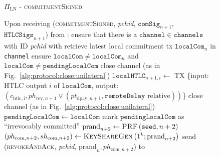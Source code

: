   \begin{figure}[H]
    \begin{protocolbox}{$\Pi_{\mathrm{LN}}$ - \textsc{commitmentSigned}}
      \begin{algorithmic}[1]
        \State Upon receiving (\textsc{commitmentSigned}, \textit{pchid},
        $\mathtt{comSig}_{n+1}$, $\mathtt{HTLCSigs}_{n+1}$) from \bob:
        \Indent
          \State ensure that there is a $\mathtt{channel} \in \mathtt{channels}$
          with ID \textit{pchid} with \bob
          \State retrieve latest local commitment tx $\mathtt{localCom}_n$ in
          \texttt{channel}
          \State ensure $\mathtt{localCom} \neq \mathtt{localCom}_n$ and
          $\mathtt{localCom} \neq \mathtt{pendingLocalCom}$
            \State close channel (as in Fig.~\ref{alg:protocol:close:unilateral})
            \State \Return
          \EndIf
            \State $\mathtt{localHTLC}_{n+1, i} \gets$ TX \{input: HTLC output
            $i$ of $\mathtt{localCom}$, output: $\left(c_{\mathrm{htlc, i}},
            ph_{\mathrm{rev}, n+1} \vee \left(pt_{\mathrm{dpay}, n+1},
            \mathtt{remoteDelay} \text{ relative}\right)\right)$\}
              \State close channel (as in
              Fig.~\ref{alg:protocol:close:unilateral})
              \State \Return
            \EndIf
          \EndFor
          \State $\mathtt{pendingLocalCom} \gets \mathtt{localCom}$
          \State mark $\mathtt{pendingLocalCom}$ as ``irrevocably committed''
          \State $\mathrm{prand}_{n+2} \gets \textsc{PRF}\left(\mathtt{seed},
          n+2\right)$
          \label{alg:protocol:pay:commitmentSigned:prf}
          \State $\left(ph_{\mathrm{com}, n+2}, sh_{\mathrm{com}, n+2}\right)
          \gets \textsc{KeyShareGen}\left(1^k; \mathrm{prand}_{n+2}\right)$
          \State send (\textsc{revokeAndAck}, \textit{pchid}, $\mathrm{prand}_n,
          ph_{\mathrm{com}, n+2}$) to \bob
        \EndIndent
      \end{algorithmic}
    \end{protocolbox}
    \caption{}
    \label{alg:protocol:pay:commitmentSigned}
  \end{figure}

